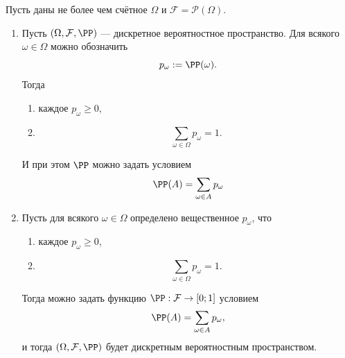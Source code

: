 \documentclass[12pt,a4paper]{article}
\begin{document}
    \begin{theorem}
        Пусть даны не более чем счётное $\Omega$ и $\mathcal{F} = \mathcal{P}(\Omega)$.
        \begin{enumerate}
            \item Пусть $(\Omega, \mathcal{F}, \PP)$ --- дискретное вероятностное пространство. Для всякого $\omega \in \Omega$ можно обозначить
                \[p_\omega := \PP(\omega).\]
                Тогда
                \begin{enumerate}
                    \item каждое $p_\omega \geqslant 0$,
                    \item
                        \[\sum_{\omega \in \Omega} p_\omega = 1.\]
                \end{enumerate}
                И при этом $\PP$ можно задать условием
                \[\PP(A) = \sum_{\omega \in A} p_\omega\]
            \item Пусть для всякого $\omega \in \Omega$ определено вещественное $p_\omega$, что
                \begin{enumerate}
                    \item каждое $p_\omega \geqslant 0$,
                    \item
                        \[\sum_{\omega \in \Omega} p_\omega = 1.\]
                \end{enumerate}
                Тогда можно задать функцию $\PP: \mathcal{F} \to [0; 1]$ условием
                \[\PP(A) = \sum_{\omega \in A} p_\omega,\]
                и тогда $(\Omega, \mathcal{F}, \PP)$ будет дискретным вероятностным пространством.
        \end{enumerate}
    \end{theorem}
\end{document}
